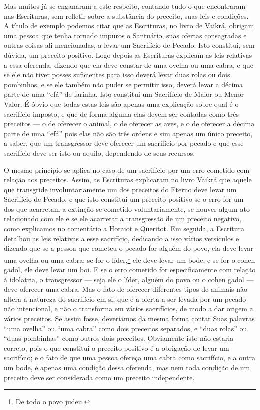 Mas muitos já se enganaram a este respeito, contando tudo o que
encontraram nas Escrituras, sem refletir sobre a substância do preceito,
suas leis e condições. A título de exemplo podemos citar que as
Escrituras, no livro de Vaikrá\starr, obrigam uma pessoa que
tenha tornado impuros o Santuário, suas ofertas consagradas e outras
coisas ali mencionadas, a levar um Sacrifício de Pecado. Isto
constitui, sem dúvida, um preceito positivo. Logo depois as Escrituras
explicam as leis relativas a essa oferenda, dizendo que ela deve
constar de uma ovelha ou uma cabra, e que se ele não tiver posses
suficientes para isso deverá levar duas rolas ou dois pombinhos, e se
ele também não puder se permitir isso, deverá levar a décima parte de
uma ``efá'' de farinha. Isto constitui um Sacrifício de Maior ou Menor
Valor. É óbvio que todas estas leis são apenas uma explicação sobre qual
é o sacrifício imposto, e que de forma alguma elas devem ser contadas
como três preceitos --- o de oferecer o animal, o de oferecer as aves,
e o de oferecer a décima parte de uma ``efá'' pois elas não são três
ordens e sim apenas um único preceito, a saber, que um transgressor deve
oferecer um sacrifício por pecado e que esse sacrifício deve ser isto ou
aquilo, dependendo de seus recursos.

O mesmo princípio se aplica no caso de um sacrifício por um erro
cometido com relação aos preceitos. Assim, as Escrituras explicaram no
livro Vaikrá\starr{} que aquele que transgride involuntariamente um dos
preceitos do Eterno deve levar um Sacrifício de Pecado, e que isto
constitui um preceito positivo se o erro for um dos que acarretam a
extinção se cometido voluntariamente, se houver algum ato relacionado
com ele e se ele acarretar a transgressão de um preceito negativo, como
explicamos no comentário a Horaiot\starr{} e Queritot\starr. Em seguida, a Escritura
detalhou as leis relativas a esse sacrifício, dedicando a isso vários
versículos e dizendo que se a pessoa que cometeu o pecado for alguém do
povo, ela deve levar uma ovelha ou uma cabra; se for o
líder,\footnote{De todo o povo judeu.} ele deve levar um bode; e se for o cohen
gadol\starr, ele deve levar um boi. E se o erro cometido for especificamente
com relação à idolatria, o transgressor --- seja ele o líder, alguém do
povo ou o cohen gadol\starr{} --- deve oferecer uma cabra. Mas o fato de
oferecer diferentes tipos de animais não altera a natureza do sacrifício
em si, que é a oferta a ser levada por um pecado não intencional, e não
o transforma em vários sacrifícios, de modo a dar origem a vários
preceitos. Se assim fosse, deveríamos da mesma forma contar Suas
palavras ``uma ovelha'' ou ``uma cabra'' como dois preceitos separados,
e ``duas rolas'' ou ``duas pombinhas'' como outros dois preceitos.
Obviamente isto não estaria correto, pois o que constitui o preceito
positivo é a obrigação de levar um sacrifício; e o fato de que uma
pessoa ofereça uma cabra como sacrifício, e a outra um bode, é apenas
uma condição dessa oferenda, mas nem toda condição de um preceito deve
ser considerada como um preceito independente.

